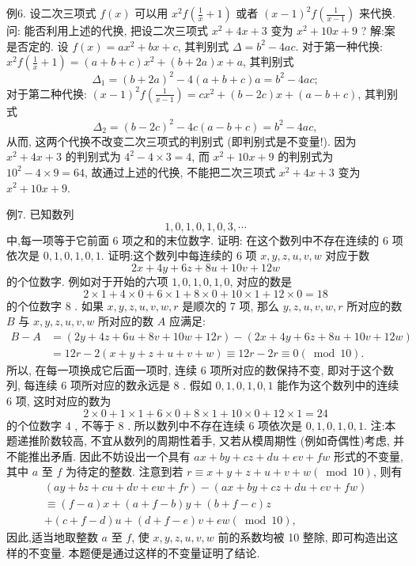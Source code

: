 例6. 设二次三项式 $f(x)$ 可以用 $x^2 f\left(\frac{1}{x}+1\right)$ 或者 $(x-1)^2 f\left(\frac{1}{x-1}\right)$ 来代换.
问: 能否利用上述的代换, 把设二次三项式 $x^2+4 x+3$ 变为 $x^2+ 10 x+9$ ?
解:案是否定的.
设 $f(x)=a x^2+b x+c$, 其判别式 $\Delta=b^2-4 a c$.
对于第一种代换: $x^2 f\left(\frac{1}{x}+1\right)=(a+b+c) x^2+(b+2 a) x+a$, 其判别式
$$
\Delta_1=(b+2 a)^2-4(a+b+c) a=b^2-4 a c ;
$$
对于第二种代换: $(x-1)^2 f\left(\frac{1}{x-1}\right)=c x^2+(b-2 c) x+(a-b+c)$, 其判别式
$$
\Delta_2=(b-2 c)^2-4 c(a-b+c)=b^2-4 a c,
$$
从而, 这两个代换不改变二次三项式的判别式 (即判别式是不变量!).
因为 $x^2+4 x+3$ 的判别式为 $4^2-4 \times 3=4$, 而 $x^2+10 x+9$ 的判别式为 $10^2-4 \times 9=64$, 故通过上述的代换, 不能把二次三项式 $x^2+4 x+3$ 变为 $x^2+10 x+9$.



例7. 已知数列
$$
1,0,1,0,1,0,3, \cdots
$$
中,每一项等于它前面 6 项之和的末位数字.
证明: 在这个数列中不存在连续的 6 项依次是 $0,1,0,1,0,1$.
证明:这个数列中每连续的 6 项 $x, y, z, u, v, w$ 对应于数
$$
2 x+4 y+6 z+8 u+10 v+12 w
$$
的个位数字.
例如对于开始的六项 $1,0,1,0,1,0$, 对应的数是
$$
2 \times 1+4 \times 0+6 \times 1+8 \times 0+10 \times 1+12 \times 0=18
$$
的个位数字 8 .
如果 $x, y, z, u, v, w, r$ 是顺次的 7 项, 那么 $y, z, u, v, w, r$ 所对应的数 $B$ 与 $x, y, z, u, v, w$ 所对应的数 $A$ 应满足:
$$
\begin{aligned}
B-A & =(2 y+4 z+6 u+8 v+10 w+12 r)-(2 x+4 y+6 z+8 u+10 v+12 w) \\
& =12 r-2(x+y+z+u+v+w) \equiv 12 r-2 r \equiv 0(\bmod 10) .
\end{aligned}
$$
所以, 在每一项换成它后面一项时, 连续 6 项所对应的数保持不变, 即对于这个数列, 每连续 6 项所对应的数永远是 8 .
假如 $0,1,0,1,0,1$ 能作为这个数列中的连续 6 项, 这时对应的数为
$$
2 \times 0+1 \times 1+6 \times 0+8 \times 1+10 \times 0+12 \times 1=24
$$
的个位数字 4 , 不等于 8 . 所以数列中不存在连续 6 项依次是 $0,1,0,1,0,1$.
注:本题递推阶数较高, 不宜从数列的周期性着手, 又若从模周期性 (例如奇偶性)考虑, 并不能推出矛盾.
因此不妨设出一个具有 $a x+b y+c z+d u+ e v+f w$ 形式的不变量, 其中 $a$ 至 $f$ 为待定的整数.
注意到若 $r \equiv x+y+z+u+v+w(\bmod 10)$, 则有
$$
\begin{gathered}
(a y+b z+c u+d v+e w+f r)-(a x+b y+c z+d u+e v+f w) \\
\equiv(f-a) x+(a+f-b) y+(b+f-c) z \\
+(c+f-d) u+(d+f-e) v+e w(\bmod 10),
\end{gathered}
$$
因此,适当地取整数 $a$ 至 $f$, 使 $x, y, z, u, v, w$ 前的系数均被 10 整除, 即可构造出这样的不变量.
本题便是通过这样的不变量证明了结论.



